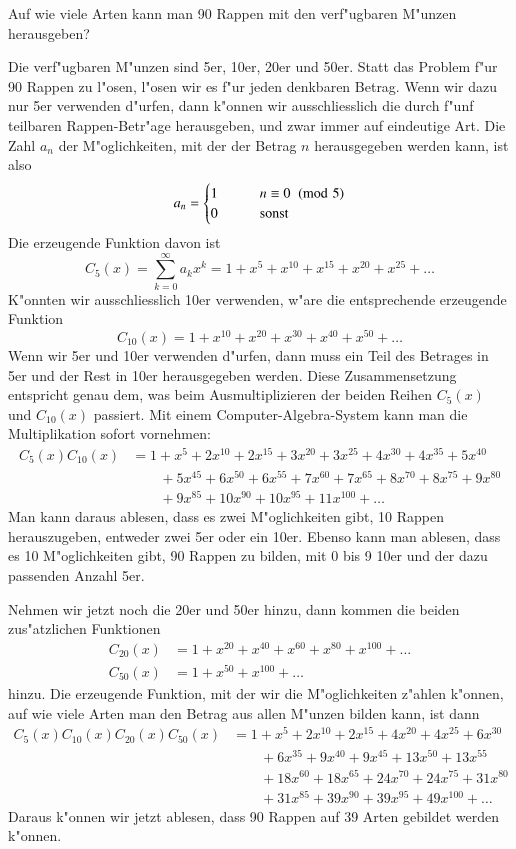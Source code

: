 \begin{beispiele}
\item 
Auf wie viele Arten kann man 90 Rappen mit den verf"ugbaren M"unzen
herausgeben?

Die verf"ugbaren M"unzen sind 5er, 10er, 20er und 50er.
Statt das Problem f"ur 90 Rappen zu l"osen, l"osen wir es f"ur jeden
denkbaren Betrag.
Wenn wir dazu nur 5er verwenden d"urfen, dann k"onnen wir ausschliesslich
die durch f"unf teilbaren Rappen-Betr"age herausgeben, und zwar immer
auf eindeutige Art.
Die Zahl $a_n$ der M"oglichkeiten, mit der der Betrag
$n$ herausgegeben werden kann, ist also
\[
a_n = \begin{cases}
1&\qquad n\equiv 0\imod{5}\\
0&\qquad \text{sonst}
\end{cases}
\]
Die erzeugende Funktion davon ist
\[
C_5(x)=\sum_{k=0}^\infty a_kx^k=1+x^5+x^{10}+x^{15}+x^{20}+x^{25}+\dots
\]
K"onnten wir ausschliesslich 10er verwenden, w"are die entsprechende
erzeugende Funktion
\[
C_{10}(x)=1+x^{10}+x^{20}+x^{30}+x^{40}+x^{50}+\dots
\]
Wenn wir 5er und 10er verwenden d"urfen, dann muss ein Teil des Betrages
in 5er und der Rest in 10er herausgegeben werden.
Diese Zusammensetzung entspricht genau dem, was beim Ausmultiplizieren
der beiden Reihen $C_5(x)$ und $C_{10}(x)$ passiert.
Mit einem Computer-Algebra-System kann man die Multiplikation sofort vornehmen:
\begin{align*}
C_5(x)C_{10}(x)&=
 1+x^5+2 x^{10}+2 x^{15}+3 x^{20}+3 x^{25}+4 x^{30}+4 x^{35}+5 x^{40}\\
&\qquad +5 x^{45} +6 x^{50}+6 x^{55}+7 x^{60}+7 x^{65}+8 x^{70}+8 x^{75}+9 x^{80}\\
&\qquad +9 x^{85}+10 x^{90}+10 x^{95}+11 x^{100}+\dots
\end{align*}
Man kann daraus ablesen, dass es zwei M"oglichkeiten gibt, 10 Rappen
herauszugeben, entweder zwei 5er oder ein 10er.
Ebenso kann man ablesen,
dass es 10 M"oglichkeiten gibt, 90 Rappen zu bilden, mit 0 bis 9 10er
und der dazu passenden Anzahl 5er.

Nehmen wir jetzt noch die 20er und 50er hinzu, dann kommen die beiden
zus"atzlichen Funktionen
\begin{align*}
C_{20}(x)&= 1+x^{20}+x^{40}+x^{60}+x^{80}+x^{100}+\dots\\
C_{50}(x)&=1+x^{50}+x^{100}+\dots
\end{align*}
hinzu.
Die erzeugende Funktion, mit der wir die M"oglichkeiten z"ahlen
k"onnen, auf wie viele Arten man den Betrag aus allen M"unzen bilden kann,
ist dann
\begin{align*}
C_5(x) C_{10}(x) C_{20}(x) C_{50}(x)
&=
1+x^5+2 x^{10}+2 x^{15}+4 x^{20}+4 x^{25}+6 x^{30}\\
&\qquad
+6 x^{35} +9 x^{40} +9 x^{45}+13 x^{50}+13 x^{55}\\
&\qquad
+18 x^{60}+18 x^{65} +24 x^{70}+24 x^{75}+31 x^{80}\\
&\qquad
+31 x^{85}+39 x^{90}+39 x^{95} +49 x^{100}+\dots
\end{align*}
Daraus k"onnen wir jetzt ablesen, dass 90 Rappen auf 39 Arten
gebildet werden k"onnen.
\end{beispiele}

